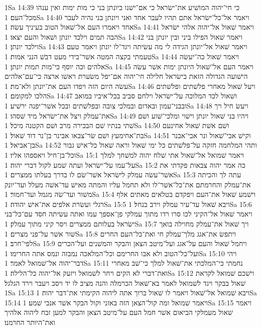 1Sa 14:39  כי חי־יהוה המושׁיע את־ישׂראל כי אם־ישׁנו ביונתן בני כי מות ימות ואין ענהו מכל־העם׃
1Sa 14:40  ויאמר אל־כל־ישׂראל אתם תהיו לעבר אחד ואני ויונתן בני נהיה לעבר אחד ויאמרו העם אל־שׁאול הטוב בעיניך עשׂה׃
1Sa 14:41  ויאמר שׁאול אל־יהוה אלהי ישׂראל הבה תמים וילכד יונתן ושׁאול והעם יצאו׃
1Sa 14:42  ויאמר שׁאול הפילו ביני ובין יונתן בני וילכד יונתן׃
1Sa 14:43  ויאמר שׁאול אל־יונתן הגידה לי מה עשׂיתה ויגד־לו יונתן ויאמר טעם טעמתי בקצה המטה אשׁר־בידי מעט דבשׁ הנני אמות׃
1Sa 14:44  ויאמר שׁאול כה־יעשׂה אלהים וכה יוסף כי־מות תמות יונתן׃
1Sa 14:45  ויאמר העם אל־שׁאול היונתן ימות אשׁר עשׂה הישׁועה הגדולה הזאת בישׂראל חלילה חי־יהוה אם־יפל משׂערת ראשׁו ארצה כי־עם־אלהים עשׂה היום הזה ויפדו העם את־יונתן ולא־מת׃
1Sa 14:46  ויעל שׁאול מאחרי פלשׁתים ופלשׁתים הלכו למקומם׃
1Sa 14:47  ושׁאול לכד המלוכה על־ישׂראל וילחם סביב בכל־איביו במואב ובבני־עמון ובאדום ובמלכי צובה ובפלשׁתים ובכל אשׁר־יפנה ירשׁיע׃
1Sa 14:48  ויעשׂ חיל ויך את־עמלק ויצל את־ישׂראל מיד שׁסהו׃
1Sa 14:49  ויהיו בני שׁאול יונתן וישׁוי ומלכי־שׁוע ושׁם שׁתי בנתיו שׁם הבכירה מרב ושׁם הקטנה מיכל׃
1Sa 14:50  ושׁם אשׁת שׁאול אחינעם בת־אחימעץ ושׁם שׂר־צבאו אבינר בן־נר דוד שׁאול׃
1Sa 14:51  וקישׁ אבי־שׁאול ונר אבי־אבנר בן־אביאל׃
1Sa 14:52  ותהי המלחמה חזקה על־פלשׁתים כל ימי שׁאול וראה שׁאול כל־אישׁ גבור וכל־בן־חיל ויאספהו אליו׃
1Sa 15:1  ויאמר שׁמואל אל־שׁאול אתי שׁלח יהוה למשׁחך למלך על־עמו על־ישׂראל ועתה שׁמע לקול דברי יהוה׃
1Sa 15:2  כה אמר יהוה צבאות פקדתי את אשׁר־עשׂה עמלק לישׂראל אשׁר־שׂם לו בדרך בעלתו ממצרים׃
1Sa 15:3  עתה לך והכיתה את־עמלק והחרמתם את־כל־אשׁר־לו ולא תחמל עליו והמתה מאישׁ עד־אשׁה מעלל ועד־יונק משׁור ועד־שׂה מגמל ועד־חמור׃
1Sa 15:4  וישׁמע שׁאול את־העם ויפקדם בטלאים מאתים אלף רגלי ועשׂרת אלפים את־אישׁ יהודה׃
1Sa 15:5  ויבא שׁאול עד־עיר עמלק וירב בנחל׃
1Sa 15:6  ויאמר שׁאול אל־הקיני לכו סרו רדו מתוך עמלקי פן־אספך עמו ואתה עשׂיתה חסד עם־כל־בני ישׂראל בעלותם ממצרים ויסר קיני מתוך עמלק׃
1Sa 15:7  ויך שׁאול את־עמלק מחוילה בואך שׁור אשׁר על־פני מצרים׃
1Sa 15:8  ויתפשׂ את־אגג מלך־עמלק חי ואת־כל־העם החרים לפי־חרב׃
1Sa 15:9  ויחמל שׁאול והעם על־אגג ועל־מיטב הצאן והבקר והמשׁנים ועל־הכרים ועל־כל־הטוב ולא אבו החרימם וכל־המלאכה נמבזה ונמס אתה החרימו׃
1Sa 15:10  ויהי דבר־יהוה אל־שׁמואל לאמר׃
1Sa 15:11  נחמתי כי־המלכתי את־שׁאול למלך כי־שׁב מאחרי ואת־דברי לא הקים ויחר לשׁמואל ויזעק אל־יהוה כל־הלילה׃
1Sa 15:12  וישׁכם שׁמואל לקראת שׁאול בבקר ויגד לשׁמואל לאמר בא־שׁאול הכרמלה והנה מציב לו יד ויסב ויעבר וירד הגלגל׃
1Sa 15:13  ויבא שׁמואל אל־שׁאול ויאמר לו שׁאול ברוך אתה ליהוה הקימתי את־דבר יהוה׃
1Sa 15:14  ויאמר שׁמואל ומה קול־הצאן הזה באזני וקול הבקר אשׁר אנכי שׁמע׃
1Sa 15:15  ויאמר שׁאול מעמלקי הביאום אשׁר חמל העם על־מיטב הצאן והבקר למען זבח ליהוה אלהיך ואת־היותר החרמנו׃
